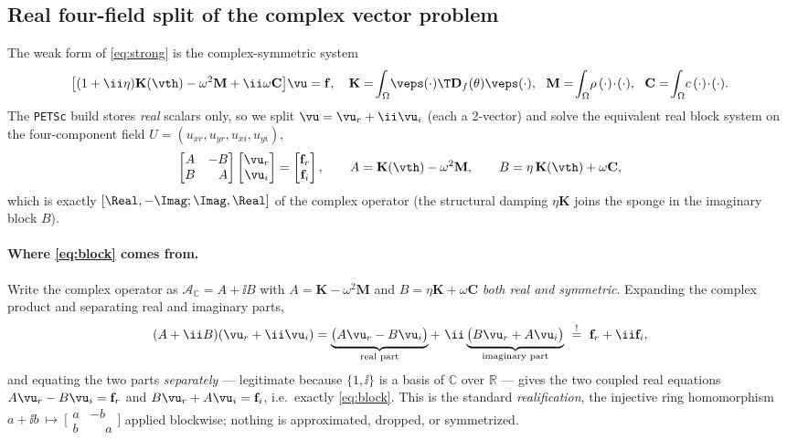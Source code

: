 \documentclass[11pt]{article}
\begin{document}
\subsection{Real four-field split of the complex vector problem}
The weak form of \eqref{eq:strong} is the complex-symmetric system
\begin{equation}
  \bigl[(1+\ii\eta)\mathbf K(\vth)-\omega^2\mathbf M+\ii\omega\mathbf C\bigr]\vu
  =\mathbf f,\quad
  \mathbf K=\!\int_\Omega\!\veps(\cdot)\T\mathbf D_f(\theta)\veps(\cdot),\ \
  \mathbf M=\!\int_\Omega\!\rho\,(\cdot)\!\cdot\!(\cdot),\ \
  \mathbf C=\!\int_\Omega\!c\,(\cdot)\!\cdot\!(\cdot).
  \label{eq:complex}
\end{equation}
The \texttt{PETSc} build stores \emph{real} scalars only, so we split
$\vu=\vu_r+\ii\vu_i$ (each a 2-vector) and solve the equivalent real block system
on the four-component field $U=(u_{xr},u_{yr},u_{xi},u_{yi})$,
\begin{equation}
  \begin{bmatrix} A & -B\\ B & \phantom{-}A\end{bmatrix}
  \begin{bmatrix} \vu_r\\ \vu_i\end{bmatrix}
  =\begin{bmatrix} \mathbf f_r\\ \mathbf f_i\end{bmatrix},\qquad
  A=\mathbf K(\vth)-\omega^2\mathbf M,\qquad B=\eta\,\mathbf K(\vth)+\omega\mathbf C,
  \label{eq:block}
\end{equation}
which is exactly $[\Real,-\Imag;\Imag,\Real]$ of the complex operator (the
structural damping $\eta\mathbf K$ joins the sponge in the imaginary block $B$).

\paragraph{Where \eqref{eq:block} comes from.} Write the complex operator as
$\mathcal A_{\mathbb C}=A+\ii B$ with $A=\mathbf K-\omega^2\mathbf M$ and
$B=\eta\mathbf K+\omega\mathbf C$ \emph{both real and symmetric}. Expanding the
complex product and separating real and imaginary parts,
\begin{equation}
  (A+\ii B)(\vu_r+\ii\vu_i)
  =\underbrace{\bigl(A\vu_r-B\vu_i\bigr)}_{\text{real part}}
  +\ \ii\underbrace{\bigl(B\vu_r+A\vu_i\bigr)}_{\text{imaginary part}}
  \ \overset{!}{=}\ \mathbf f_r+\ii\mathbf f_i ,
\end{equation}
and equating the two parts \emph{separately} --- legitimate because
$\{1,\ii\}$ is a basis of $\mathbb C$ over $\mathbb R$ --- gives the two coupled
real equations $A\vu_r-B\vu_i=\mathbf f_r$ and $B\vu_r+A\vu_i=\mathbf f_i$, i.e.\
exactly \eqref{eq:block}. This is the standard \emph{realification}, the injective
ring homomorphism
$a+\ii b\ \mapsto\ \bigl[\begin{smallmatrix}a&-b\\ b&\phantom{-}a\end{smallmatrix}\bigr]$
applied blockwise; nothing is approximated, dropped, or symmetrized.
\end{document}
